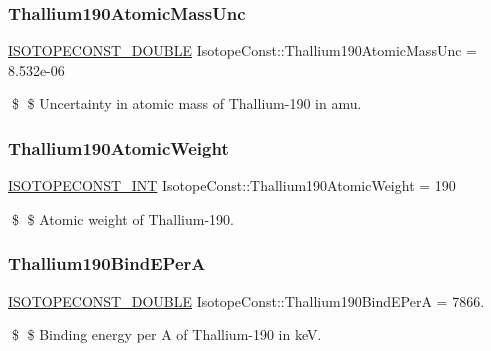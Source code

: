 \subsubsection{\texorpdfstring{Thallium190\+Atomic\+Mass\+Unc}{Thallium190AtomicMassUnc}}
{\footnotesize\ttfamily \mbox{\hyperlink{group___isotope_const-_macros_ga8f45a7272ce02c0b4c65c44636ed719a}{I\+S\+O\+T\+O\+P\+E\+C\+O\+N\+S\+T\+\_\+\+D\+O\+U\+B\+LE}} Isotope\+Const\+::\+Thallium190\+Atomic\+Mass\+Unc = 8.\+532e-\/06}

\$ \$ Uncertainty in atomic mass of Thallium-\/190 in amu. \mbox{\label{group___isotope_const-_thallium-_tl190_ga0bd19914b582bf8d1f93bf8197a7b370}} 
\subsubsection{\texorpdfstring{Thallium190\+Atomic\+Weight}{Thallium190AtomicWeight}}
{\footnotesize\ttfamily \mbox{\hyperlink{group___isotope_const-_macros_ga5f18360b3e99483a35c32d789e62621c}{I\+S\+O\+T\+O\+P\+E\+C\+O\+N\+S\+T\+\_\+\+I\+NT}} Isotope\+Const\+::\+Thallium190\+Atomic\+Weight = 190}

\$ \$ Atomic weight of Thallium-\/190. \mbox{\label{group___isotope_const-_thallium-_tl190_ga5bf8985fcaf75caa8a0ee30cd83cc74a}} 
\subsubsection{\texorpdfstring{Thallium190\+Bind\+E\+PerA}{Thallium190BindEPerA}}
{\footnotesize\ttfamily \mbox{\hyperlink{group___isotope_const-_macros_ga8f45a7272ce02c0b4c65c44636ed719a}{I\+S\+O\+T\+O\+P\+E\+C\+O\+N\+S\+T\+\_\+\+D\+O\+U\+B\+LE}} Isotope\+Const\+::\+Thallium190\+Bind\+E\+PerA = 7866.}

\$ \$ Binding energy per A of Thallium-\/190 in keV. \mbox{\label{group___isotope_const-_thallium-_tl190_gad2ae976c93f090fa969c4d359e6d6188}} 
